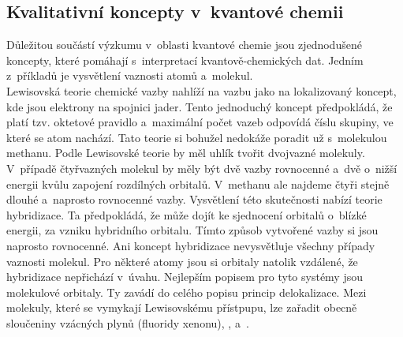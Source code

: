 \documentclass[
  printed, %
  table,   %
  lof,     %
  lot,     %
  oneside,
]{fithesis3}
\begin{document}
\subsection{Kvalitativní koncepty v~kvantové chemii}
Důležitou součástí výzkumu v~oblasti kvantové chemie jsou zjednodušené koncepty, které pomáhají s~interpretací kvantově-chemických dat. Jedním z~příkladů je vysvětlení vaznosti atomů a~molekul. \\
Lewisovská teorie chemické vazby nahlíží na vazbu jako na lokalizovaný koncept, kde jsou elektrony na spojnici jader. Tento jednoduchý koncept předpokládá, že platí tzv. oktetové pravidlo a~maximální počet vazeb odpovídá číslu skupiny, ve které se atom nachází. Tato teorie si bohužel nedokáže poradit už s~molekulou methanu. Podle Lewisovské teorie by měl uhlík tvořit dvojvazné molekuly. V~případě čtyřvazných molekul by měly být dvě vazby rovnocenné a~dvě o~nižší energii kvůlu zapojení rozdílných orbitalů. V~methanu ale najdeme čtyři stejně dlouhé a~naprosto rovnocenné vazby. Vysvětlení této skutečnosti nabízí teorie hybridizace. Ta předpokládá, že může dojít ke sjednocení orbitalů o~blízké energii, za vzniku hybridního orbitalu. Tímto způsob vytvořené vazby si jsou naprosto rovnocenné. Ani koncept hybridizace nevysvětluje všechny případy vaznosti molekul. Pro některé atomy jsou si orbitaly natolik vzdálené, že hybridizace nepřichází v~úvahu. Nejlepším popisem pro tyto systémy jsou molekulové orbitaly. Ty zavádí do celého popisu princip delokalizace. Mezi molekuly, které se vymykají Lewisovskému přístpupu, lze zařadit obecně sloučeniny vzácných plynů (fluoridy xenonu),  ,  a~. \\
\end{document}
